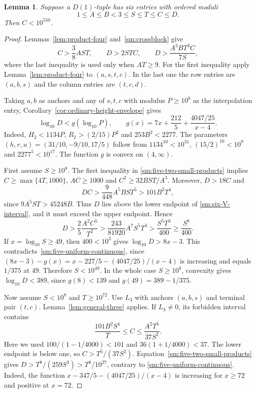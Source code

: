 \documentclass[12pt]{article}
\newtheorem{lemma}[theorem]{Lemma}
\numberwithin{equation}{section}
\begin{document}
\begin{lemma}\label{sm:bs7-cutoff}
Suppose a $D(1)$-tuple has six entries with ordered moduli
\[
 1\le A\le B<3\le S\le T\le C\le D.
\]
Then $C<10^{550}$.
\end{lemma}
\begin{proof}
Lemmas~\ref{lem:product-four} and~\ref{sm:crossblock} give
\begin{equation}\label{sm:five-two-small-products}
 C>\frac38AST,\qquad D>2STC,\qquad
 D>\frac{A^3BT^3C}{7S},
\end{equation}
where the last inequality is used only when $AT\ge9$.
For the first inequality apply Lemma~\ref{lem:product-four} to
$(a,s,t,c)$. In the last one the row entries are $(a,b,s)$ and the
column entries are $(t,c,d)$.

Taking $a,b$ as anchors and any of $s,t,c$ with modulus $P\ge10^8$ as the interpolation entry, Corollary~\ref{cor:ordinary-height-envelope} gives
\begin{equation}\label{sm:five-uniform-continuous}
 \log_{10}D<g(\log_{10}P),\qquad
 g(x)=7x+\frac{212}{5}+\frac{4047/25}{x-4}.
\end{equation}
Indeed, $H_2<1134P$, $R_2>(2/15)P^2$ and $253B^2<2277$.
The parameters $(h,r,u)=(31/10,-9/10,17/5)$ follow from
$1134^{10}<10^{31}$, $(15/2)^{10}<10^9$ and $2277^5<10^{17}$.
The function $g$ is convex on $(4,\infty)$.

First assume $S\ge10^8$. The first inequality in
\eqref{sm:five-two-small-products} implies
$C\ge\max\{4T,1000\}$, $AC\ge1000$ and $C^2\ge32BST/A^3$.
Moreover, $D>18C$ and
\[
 DC>\frac9{448}A^5BST^5>101B^2T^4,
\]
since $9A^5ST>45248B$. Thus $D$ lies above the lower endpoint of
\eqref{sm:six-V-interval}, and it must exceed the upper endpoint. Hence
\begin{equation*}
 D>\frac25\frac{A^2C^5}{T^2}
  >\frac{243}{81920}A^7S^5T^3
  >\frac{S^5T^3}{400}\ge\frac{S^8}{400}.
\end{equation*}
If $x=\log_{10}S\ge49$, then $400<10^3$ gives $\log_{10}D>8x-3$. This contradicts~\eqref{sm:five-uniform-continuous}, since $(8x-3)-g(x)=x-227/5-(4047/25)/(x-4)$ is increasing and equals $1/375$ at $49$.
Therefore $S<10^{49}$. In the whole case $S\ge10^8$, convexity gives
$\log_{10}D<389$, since $g(8)<139$ and $g(49)=389-1/375$.

Now assume $S<10^8$ and $T\ge10^{72}$. Use $L_3$ with anchors
$(a,b,s)$ and terminal pair $(t,c)$. Lemma~\ref{lem:general-three}
applies. If $L_3\ne0$, its forbidden interval contains
\[
 \frac{101B^2S^4}{T}\le C\le\frac{A^2T^5}{37S^2}.
\]
Here we used $100/(1-1/4000)<101$ and
$36(1+1/4000)<37$. The lower endpoint is below one, so
$C>T^5/(37S^2)$. Equation~\eqref{sm:five-two-small-products} gives
$D>T^8/(259S^3)>T^8/10^{27}$, contrary to
\eqref{sm:five-uniform-continuous}. Indeed,
the function $x-347/5-(4047/25)/(x-4)$ is increasing for $x\ge72$ and positive at $x=72$.


\end{proof}
\end{document}

